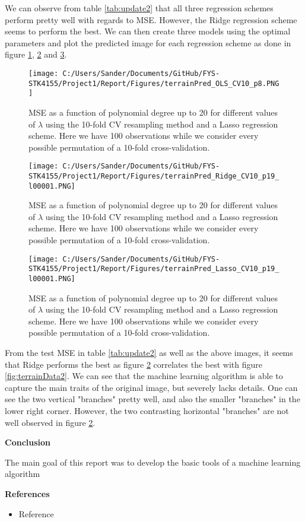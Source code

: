 \documentclass[12pt,a4paper]{article}
\begin{document}
\noindent We can observe from table \ref{tab:update2} that all three regression schemes perform pretty well with regards to MSE. However, the Ridge regression scheme seems to perform the best. We can then create three models using the optimal parameters and plot the predicted image for each regression scheme as done in figure \ref{fig:predOLST}, \ref{fig:predRIDGET} and \ref{fig:predLASSOT}.

\begin{figure}[H]
\centering
\texttt{[image: C:/Users/Sander/Documents/GitHub/FYS-STK4155/Project1/Report/Figures/terrainPred\_OLS\_CV10\_p8.PNG]}
\caption{\label{fig:predOLST} MSE as a function of polynomial degree up to 20 for different values of $\lambda$ using the 10-fold CV resampling method and a Lasso regression scheme. Here we have 100 observations while we consider every possible permutation of a 10-fold cross-validation.}
\end{figure}

\begin{figure}[H]
\centering
\texttt{[image: C:/Users/Sander/Documents/GitHub/FYS-STK4155/Project1/Report/Figures/terrainPred\_Ridge\_CV10\_p19\_l00001.PNG]}
\caption{\label{fig:predRIDGET} MSE as a function of polynomial degree up to 20 for different values of $\lambda$ using the 10-fold CV resampling method and a Lasso regression scheme. Here we have 100 observations while we consider every possible permutation of a 10-fold cross-validation.}
\end{figure}

\begin{figure}[H]
\centering
\texttt{[image: C:/Users/Sander/Documents/GitHub/FYS-STK4155/Project1/Report/Figures/terrainPred\_Lasso\_CV10\_p19\_l00001.PNG]}
\caption{\label{fig:predLASSOT} MSE as a function of polynomial degree up to 20 for different values of $\lambda$ using the 10-fold CV resampling method and a Lasso regression scheme. Here we have 100 observations while we consider every possible permutation of a 10-fold cross-validation.}
\end{figure}

\noindent From the test MSE in table \ref{tab:update2} as well as the above images, it seems that Ridge performs the best as figure \ref{fig:predRIDGET} correlates the best with figure \ref{fig:terrainData2}. We can see that the machine learning algorithm is able to capture the main traits of the original image, but severely lacks details. One can see the two vertical "branches" pretty well, and also the smaller "branches" in the lower right corner. However, the two contrasting horizontal "branches" are not well observed in figure \ref{fig:predRIDGET}. 

\newpage

\begin{center}
\Large{\textbf{Conclusion}}
\end{center}

\noindent The main goal of this report was to develop the basic tools of a machine learning algorithm 

\newpage

\begin{center}
\Large{\textbf{References}}
\end{center}

\begin{itemize}
  \item Reference
\end{itemize}
\end{document}

